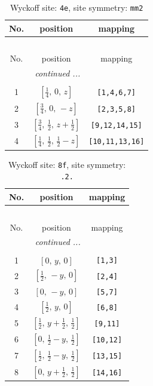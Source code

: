 \documentclass[fleqn,8pt]{jsarticle}
\begin{document}
\renewcommand{\arraystretch}{1.2}
\begin{longtable}{ccc}
\caption{Wyckoff site: {\tt 4e}, site symmetry: {\tt mm2}}
 \\
 \hline \hline
No. & position & mapping \\ \hline \endfirsthead

\multicolumn{2}{l}{\tablename\ \thetable{}} \\
 \hline \hline
No. & position & mapping \\ \hline \endhead

 \hline \hline
\multicolumn{2}{r}{\footnotesize\it continued ...} \\ \endfoot

 \hline \hline
\multicolumn{2}{r}{} \\ \endlastfoot

1 & $\left[ \frac{1}{4},\, 0,\, z \right]$ & {\tt [1,4,6,7]} \\ \hline
2 & $\left[ \frac{3}{4},\, 0,\, - z \right]$ & {\tt [2,3,5,8]} \\ \hline
3 & $\left[ \frac{3}{4},\, \frac{1}{2},\, z + \frac{1}{2} \right]$ & {\tt [9,12,14,15]} \\ \hline
4 & $\left[ \frac{1}{4},\, \frac{1}{2},\, \frac{1}{2} - z \right]$ & {\tt [10,11,13,16]} \\
\end{longtable}
\renewcommand{\arraystretch}{1.2}
\begin{longtable}{ccc}
\caption{Wyckoff site: {\tt 8f}, site symmetry: {\tt .2.}}
 \\
 \hline \hline
No. & position & mapping \\ \hline \endfirsthead

\multicolumn{2}{l}{\tablename\ \thetable{}} \\
 \hline \hline
No. & position & mapping \\ \hline \endhead

 \hline \hline
\multicolumn{2}{r}{\footnotesize\it continued ...} \\ \endfoot

 \hline \hline
\multicolumn{2}{r}{} \\ \endlastfoot

1 & $\left[ 0,\, y,\, 0 \right]$ & {\tt [1,3]} \\ \hline
2 & $\left[ \frac{1}{2},\, - y,\, 0 \right]$ & {\tt [2,4]} \\ \hline
3 & $\left[ 0,\, - y,\, 0 \right]$ & {\tt [5,7]} \\ \hline
4 & $\left[ \frac{1}{2},\, y,\, 0 \right]$ & {\tt [6,8]} \\ \hline
5 & $\left[ \frac{1}{2},\, y + \frac{1}{2},\, \frac{1}{2} \right]$ & {\tt [9,11]} \\ \hline
6 & $\left[ 0,\, \frac{1}{2} - y,\, \frac{1}{2} \right]$ & {\tt [10,12]} \\ \hline
7 & $\left[ \frac{1}{2},\, \frac{1}{2} - y,\, \frac{1}{2} \right]$ & {\tt [13,15]} \\ \hline
8 & $\left[ 0,\, y + \frac{1}{2},\, \frac{1}{2} \right]$ & {\tt [14,16]} \\
\end{longtable}
\end{document}
